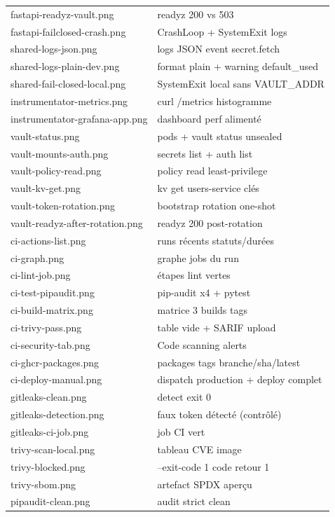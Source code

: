 \documentclass[12pt,a4paper,twoside,openright]{report}
\begin{document}
{\begin{longtable}{@{}p{5.6cm}p{9.4cm}@{}}
fastapi-readyz-vault.png & readyz 200 vs 503 \\
fastapi-failclosed-crash.png & CrashLoop + SystemExit logs \\
shared-logs-json.png & logs JSON event secret.fetch \\
shared-logs-plain-dev.png & format plain + warning default\_used \\
shared-fail-closed-local.png & SystemExit local sans VAULT\_ADDR \\
instrumentator-metrics.png & curl /metrics histogramme \\
instrumentator-grafana-app.png & dashboard perf alimenté \\
vault-status.png & pods + vault status unsealed \\
vault-mounts-auth.png & secrets list + auth list \\
vault-policy-read.png & policy read least-privilege \\
vault-kv-get.png & kv get users-service clés \\
vault-token-rotation.png & bootstrap rotation one-shot \\
vault-readyz-after-rotation.png & readyz 200 post-rotation \\
ci-actions-list.png & runs récents statuts/durées \\
ci-graph.png & graphe jobs du run \\
ci-lint-job.png & étapes lint vertes \\
ci-test-pipaudit.png & pip-audit x4 + pytest \\
ci-build-matrix.png & matrice 3 builds tags \\
ci-trivy-pass.png & table vide + SARIF upload \\
ci-security-tab.png & Code scanning alerts \\
ci-ghcr-packages.png & packages tags branche/sha/latest \\
ci-deploy-manual.png & dispatch production + deploy complet \\
gitleaks-clean.png & detect exit 0 \\
gitleaks-detection.png & faux token détecté (contrôlé) \\
gitleaks-ci-job.png & job CI vert \\
trivy-scan-local.png & tableau CVE image \\
trivy-blocked.png & --exit-code 1 code retour 1 \\
trivy-sbom.png & artefact SPDX aperçu \\
pipaudit-clean.png & audit strict clean \\

\end{longtable}}
\end{document}
